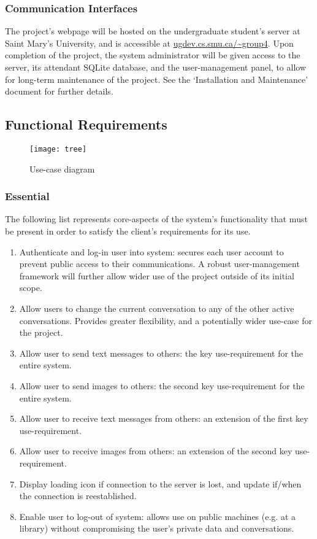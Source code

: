 \documentclass[11pt]{article}
\begin{document}
\subsubsection{Communication Interfaces}
The project's webpage will be hosted on the undergraduate student's server at Saint Mary's
University, and is accessible at \url{ugdev.cs.smu.ca/~group4}. Upon completion of the project, the
system administrator will be given access to the server, its attendant SQLite database, and the
user-management panel, to allow for long-term maintenance of the project. See the `Installation
and Maintenance' document for further details.

\subsection{Functional Requirements}

\begin{figure}[!htb]
  \centering
  \texttt{[image: tree]}
  \caption{Use-case diagram}
\end{figure}

\subsubsection{Essential}
The following list represents core-aspects of the system's functionality that must be present in
order to satisfy the client's requirements for its use.
\begin{enumerate}
    \item Authenticate and log-in user into system: secures each user account to prevent public
        access to their communications. A robust user-management framework will further allow
        wider use of the project outside of its initial scope.
    \item Allow users to change the current conversation to any of the other active conversations.
        Provides greater flexibility, and a potentially wider use-case for the project.
    \item Allow user to send text messages to others: the key use-requirement for the entire system.
    \item Allow user to send images to others: the second key use-requirement for the entire system.
    \item Allow user to receive text messages from others: an extension of the first key
        use-requirement.
    \item Allow user to receive images from others: an extension of the second key use-requirement.
    \item Display loading icon if connection to the server is lost, and update if/when the
        connection is reestablished.
    \item Enable user to log-out of system: allows use on public machines (e.g. at a library)
        without compromising the user's private data and conversations.
\end{enumerate}
\end{document}
